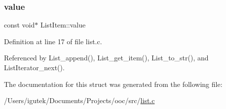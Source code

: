 \subsubsection{\texorpdfstring{value}{value}}
{\footnotesize\ttfamily const void$\ast$ List\+Item\+::value}



Definition at line 17 of file list.\+c.



Referenced by List\+\_\+append(), List\+\_\+get\+\_\+item(), List\+\_\+to\+\_\+str(), and List\+Iterator\+\_\+next().



The documentation for this struct was generated from the following file\+:\begin{DoxyCompactItemize}
\item 
/\+Users/igutek/\+Documents/\+Projects/ooc/src/\mbox{\hyperlink{list_8c}{list.\+c}}\end{DoxyCompactItemize}
